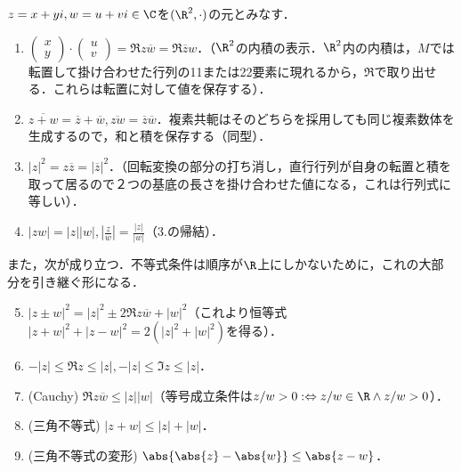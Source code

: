 \documentclass[uplatex, dvipdfmx]{jsreport}
\begin{document}
\begin{lemma}\label{lemma-abs-conj}
    $z=x+yi, w=u+vi\in\C$を$(\R^2,\cdot)$の元とみなす．
    \begin{enumerate}
        \item $\begin{pmatrix}x\\y\end{pmatrix}\cdot\begin{pmatrix}u\\v\end{pmatrix} = \Re z\overline{w}=\Re \overline{z}w$．（$\R^2$の内積の表示．$\R^2$内の内積は，$M$では転置して掛け合わせた行列の11または22要素に現れるから，$\Re$で取り出せる．これらは転置に対して値を保存する）．
        \item $\overline{z+w}=\overline{z}+\overline{w}, \overline{zw}=\overline{z}\overline{w}$．複素共軛はそのどちらを採用しても同じ複素数体を生成するので，和と積を保存する（同型）．
        \item $|z|^2=z\overline{z}=|\overline{z}|^2$．（回転変換の部分の打ち消し，直行行列が自身の転置と積を取って居るので２つの基底の長さを掛け合わせた値になる，これは行列式に等しい）．
        \item $|zw|=|z||w|, \left|\frac{z}{w}\right|=\frac{|z|}{|w|}$（3.の帰結）．
    \end{enumerate}
    また，次が成り立つ．不等式条件は順序が$\R$上にしかないために，これの大部分を引き継ぐ形になる．
    \begin{enumerate}\setcounter{enumi}{4}
        \item $|z\pm w|^2=|z|^2\pm 2\Re z\overline{w}+|w|^2$（これより恒等式$|z+w|^2+|z-w|^2=2(|z|^2+|w|^2)$を得る）．
        \item $-|z|\le\Re z\le|z|,-|z|\le\Im z\le |z|$．
        \item (Cauchy) $\Re z\overline{w}\le|z||w|$（等号成立条件は$z/w>0:\Leftrightarrow z/w\in\R\land z/w>0$）．
        \item (三角不等式) $|z+w|\le|z|+|w|$．
        \item (三角不等式の変形) $\abs{\abs{z}-\abs{w}}\le\abs{z-w}$．
    \end{enumerate}
\end{lemma}
\end{document}
